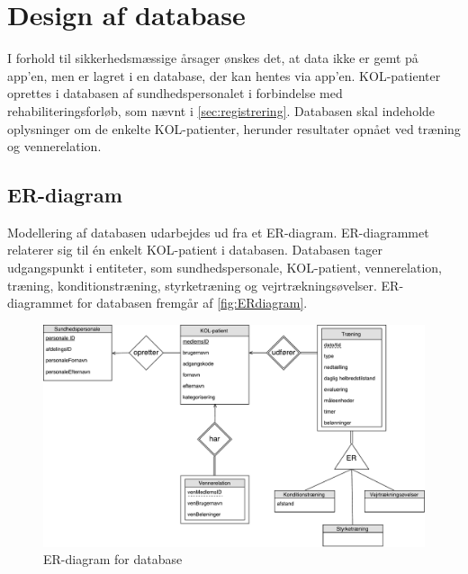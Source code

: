 \section{Design af database}
I forhold til sikkerhedsmæssige årsager ønskes det, at data ikke er gemt på app’en, men er lagret i en database, der kan hentes via app’en. KOL-patienter oprettes i databasen af sundhedspersonalet i forbindelse med rehabiliteringsforløb, som nævnt i \autoref{sec:registrering}. Databasen skal indeholde oplysninger om de enkelte KOL-patienter, herunder resultater opnået ved træning og vennerelation. 

\subsection{ER-diagram}
Modellering af databasen udarbejdes ud fra et ER-diagram. ER-diagrammet relaterer sig til én enkelt KOL-patient i databasen. Databasen tager udgangspunkt i entiteter, som sundhedspersonale, KOL-patient, vennerelation, træning, konditionstræning, styrketræning og vejrtrækningsøvelser. ER-diagrammet for databasen fremgår af \autoref{fig:ERdiagram}.


\begin{figure} [H]
\centering
\includegraphics[width=1\textwidth]{figures/Aktivitetsdiagram/ERdiagram}
\caption{ER-diagram for database}
\label{fig:ERdiagram}
\end{figure} 


